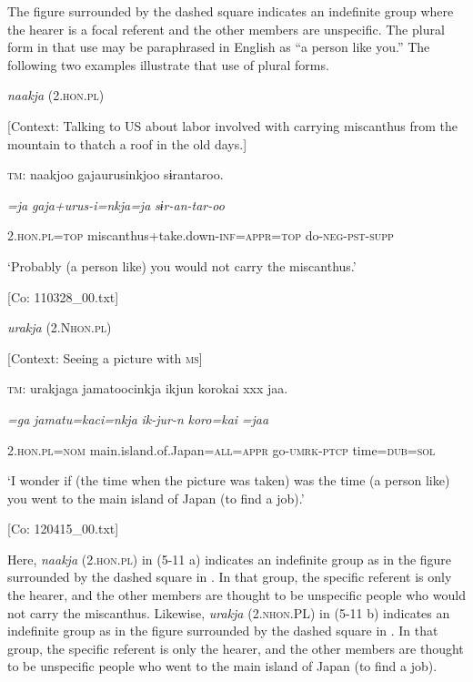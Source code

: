 \noindent The figure surrounded by the dashed square indicates an indefinite group where the hearer is a focal referent and the other members are unspecific. The plural form in that use may be paraphrased in English as “a person like you.” The following two examples illustrate that use of plural forms.

\ea \label{ex:5:11}  \ea \label{ex:5:11a} \textit{naakja} (2.\textsc{hon}.\textsc{pl})

    [Context: Talking to US about labor involved with carrying miscanthus from the mountain to thatch a roof in the old days.]

    \textsc{tm}:  naakjoo  gajaurusinkjoo  sɨrantaroo.

      \textit{=ja}  \textit{gaja+urus-i=nkja=ja} \textit{sɨr-an-tar-oo}
                                                       
      2.\textsc{hon}.\textsc{pl}=\textsc{top}  miscanthus+take.down-\textsc{inf}=\textsc{appr=top}  do-\textsc{neg}-\textsc{pst}-\textsc{supp}

      ‘Probably (a person like) you would not carry the miscanthus.’

      [Co: 110328\_00.txt]

 \ex \label{ex:5:b} \textit{urakja} (2.N\textsc{hon}.\textsc{pl})

    [Context: Seeing a picture with \textsc{ms}]

    \textsc{tm}:  urakjaga  jamatoocinkja  ikjun  {\textbar}koro{\textbar}kai  xxx  jaa.

      \textit{=ga}  \textit{jamatu=kaci=nkja} \textit{ik-jur-n}  \textit{koro=kai}    \textit{=jaa}
                                                   
      2\textsc{.hon.pl}=\textsc{nom}  main.island.of.Japan=\textsc{all}=\textsc{appr}  go-\textsc{umrk}-\textsc{ptcp}  time=\textsc{dub}=\textsc{sol}

      ‘I wonder if (the time when the picture was taken) was the time (a person like) you went to the main island of Japan (to find a job).’

      [Co: 120415\_00.txt]
      \z
      \z

\noindent Here, \textit{naakja} (2.\textsc{hon}.\textsc{pl}) in (5-11 a) indicates an indefinite group as in the figure surrounded by the dashed square in . In that group, the specific referent is only the hearer, and the other members are thought to be unspecific people who would not carry the miscanthus. Likewise, \textit{urakja} (2.\textsc{nhon}.PL) in (5-11 b) indicates an indefinite group as in the figure surrounded by the dashed square in . In that group, the specific referent is only the hearer, and the other members are thought to be unspecific people who went to the main island of Japan (to find a job).

